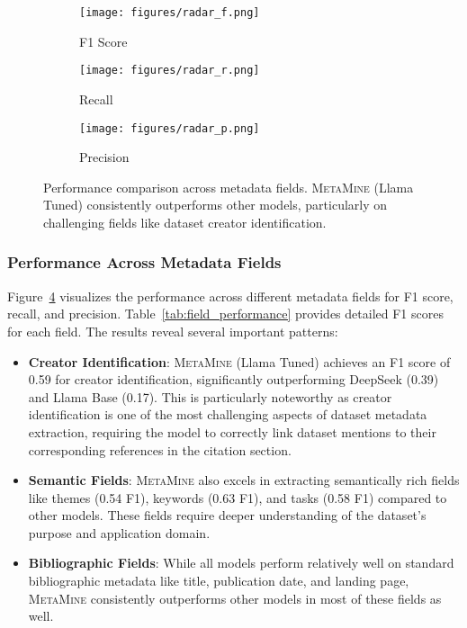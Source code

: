 \documentclass[runningheads]{llncs}
\begin{document}
\begin{figure}[t]
\centering
\begin{subfigure}[b]{0.33\textwidth}
  \centering
  \texttt{[image: figures/radar\_f.png]}
  \caption{F1 Score}
  \label{fig:radar_f1}
\end{subfigure}%
\begin{subfigure}[b]{0.33\textwidth}
  \centering
  \texttt{[image: figures/radar\_r.png]}
  \caption{Recall}
  \label{fig:radar_recall}
\end{subfigure}%
\begin{subfigure}[b]{0.33\textwidth}
  \centering
  \texttt{[image: figures/radar\_p.png]}
  \caption{Precision}
  \label{fig:radar_precision}
\end{subfigure}
\caption{Performance comparison across metadata fields. \textsc{MetaMine} (Llama Tuned) consistently outperforms other models, particularly on challenging fields like dataset creator identification.}
\label{fig:radar_charts}
\end{figure}

\subsubsection{Performance Across Metadata Fields}
Figure~\ref{fig:radar_charts} visualizes the performance across different metadata fields for F1 score, recall, and precision. Table~\ref{tab:field_performance} provides detailed F1 scores for each field. The results reveal several important patterns:
\begin{itemize}
 \item \textbf{Creator Identification}: \textsc{MetaMine} (Llama Tuned) achieves an F1 score of 0.59 for creator identification, significantly outperforming DeepSeek (0.39) and Llama Base (0.17). This is particularly noteworthy as creator identification is one of the most challenging aspects of dataset metadata extraction, requiring the model to correctly link dataset mentions to their corresponding references in the citation section.
 \item \textbf{Semantic Fields}: \textsc{MetaMine} also excels in extracting semantically rich fields like themes (0.54 F1), keywords (0.63 F1), and tasks (0.58 F1) compared to other models. These fields require deeper understanding of the dataset's purpose and application domain.
   \item  \textbf{Bibliographic Fields}: While all models perform relatively well on standard bibliographic metadata like title, publication date, and landing page, \textsc{MetaMine} consistently outperforms other models in most of these fields as well.
\end{itemize}
\end{document}
